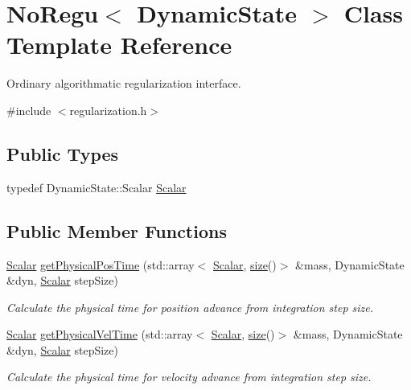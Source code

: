 \hypertarget{class_no_regu}{}\section{No\+Regu$<$ Dynamic\+State $>$ Class Template Reference}
\label{class_no_regu}


Ordinary algorithmatic regularization interface.  




{\ttfamily \#include $<$regularization.\+h$>$}

\subsection*{Public Types}
\begin{DoxyCompactItemize}
\item 
typedef Dynamic\+State\+::\+Scalar \mbox{\hyperlink{class_no_regu_aa6d40425c316da9c24b55bc908d3cd14}{Scalar}}
\end{DoxyCompactItemize}
\subsection*{Public Member Functions}
\begin{DoxyCompactItemize}
\item 
\mbox{\hyperlink{class_no_regu_aa6d40425c316da9c24b55bc908d3cd14}{Scalar}} \mbox{\hyperlink{class_no_regu_a0c365c1758907b76ee8bf5138f3b20be}{get\+Physical\+Pos\+Time}} (std\+::array$<$ \mbox{\hyperlink{class_no_regu_aa6d40425c316da9c24b55bc908d3cd14}{Scalar}}, \mbox{\hyperlink{class_no_regu_ade4184183a8b2c2095831f3a54e1836a}{size}}()$>$ \&mass, Dynamic\+State \&dyn, \mbox{\hyperlink{class_no_regu_aa6d40425c316da9c24b55bc908d3cd14}{Scalar}} step\+Size)
\begin{DoxyCompactList}\small\item\em Calculate the physical time for position advance from integration step size. \end{DoxyCompactList}\item 
\mbox{\hyperlink{class_no_regu_aa6d40425c316da9c24b55bc908d3cd14}{Scalar}} \mbox{\hyperlink{class_no_regu_a3294ff362189dbdcab88a094ada2ce1c}{get\+Physical\+Vel\+Time}} (std\+::array$<$ \mbox{\hyperlink{class_no_regu_aa6d40425c316da9c24b55bc908d3cd14}{Scalar}}, \mbox{\hyperlink{class_no_regu_ade4184183a8b2c2095831f3a54e1836a}{size}}()$>$ \&mass, Dynamic\+State \&dyn, \mbox{\hyperlink{class_no_regu_aa6d40425c316da9c24b55bc908d3cd14}{Scalar}} step\+Size)
\begin{DoxyCompactList}\small\item\em Calculate the physical time for velocity advance from integration step size. \end{DoxyCompactList}\end{DoxyCompactItemize}

